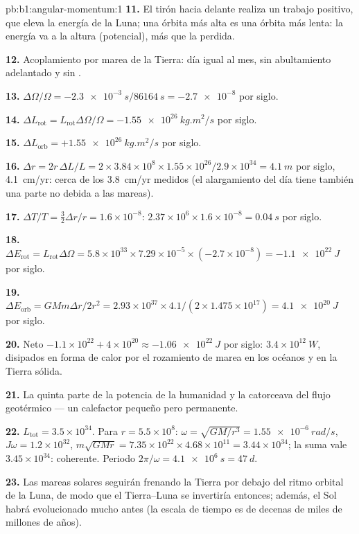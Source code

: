 \begin{solution}{pb:b1:angular-momentum:1}
\textbf{11.} El tirón hacia delante realiza un trabajo positivo, que eleva
la energía de la Luna; una órbita más alta es una órbita más lenta: la
energía va a la altura (potencial), más que la  perdida.

\textbf{12.} Acoplamiento por marea de la Tierra: día igual al mes, sin
abultamiento adelantado y sin .

\textbf{13.} $\Delta\Omega/\Omega = -\qty{2.3e-3}{s}/\qty{86164}{s} =
\num{-2.7e-8}$ por siglo.

\textbf{14.} $\Delta L_{\text{rot}} = L_{\text{rot}}\Delta\Omega/\Omega =
\qty{-1.55e26}{kg.m^2/s}$ por siglo.

\textbf{15.} $\Delta L_{\text{orb}} = +\qty{1.55e26}{kg.m^2/s}$ por siglo.

\textbf{16.} $\Delta r = 2r\,\Delta L/L = 2 \times 3.84\times10^8 \times 1.55
\times10^{26}/2.9\times10^{34} = \qty{4.1}{m}$ por siglo, \qty{4.1}{cm/yr}:
cerca de los \qty{3.8}{cm/yr} medidos (el alargamiento del día tiene
también una parte no debida a las mareas).

\textbf{17.} $\Delta T/T = \tfrac32\Delta r/r = 1.6\times10^{-8}$: $2.37\times
10^6 \times 1.6\times10^{-8} = \qty{0.04}{s}$ por siglo.

\textbf{18.} $\Delta E_{\text{rot}} = L_{\text{rot}}\Delta\Omega = 5.8\times10^{33}
\times 7.29\times10^{-5} \times (-2.7\times10^{-8}) = \qty{-1.1e22}{J}$ por
siglo.

\textbf{19.} $\Delta E_{\text{orb}} = GMm\Delta r/2r^2 = 2.93\times10^{37}
\times 4.1/(2 \times 1.475\times10^{17}) = \qty{+4.1e20}{J}$ por siglo.

\textbf{20.} Neto $-1.1\times10^{22} + 4\times10^{20} \approx \qty{-1.06e22}{J}$
por siglo: $3.4\times10^{12}\ \unit{W}$, disipados en forma de calor por el
rozamiento de marea en los océanos y en la Tierra sólida.

\textbf{21.} La quinta parte de la potencia de la humanidad y la
catorceava del flujo geotérmico --- un calefactor pequeño pero permanente.

\textbf{22.} $L_{\text{tot}} = 3.5\times10^{34}$. Para $r = 5.5\times10^8$:
$\omega = \sqrt{GM/r^3} = \qty{1.55e-6}{rad/s}$, $J\omega = 1.2\times10^{32}$,
$m\sqrt{GMr} = 7.35\times10^{22} \times 4.68\times10^{11} = 3.44\times10^{34}$;
la suma vale $3.45\times10^{34}$: coherente. Periodo $2\pi/\omega = \qty{4.1e6}{s}
= \qty{47}{d}$.

\textbf{23.} Las mareas solares seguirán frenando la Tierra por debajo del
ritmo orbital de la Luna, de modo que el  Tierra--Luna se invertiría
entonces; además, el Sol habrá evolucionado mucho antes (la escala de
tiempo es de decenas de miles de millones de años).


\end{solution}
